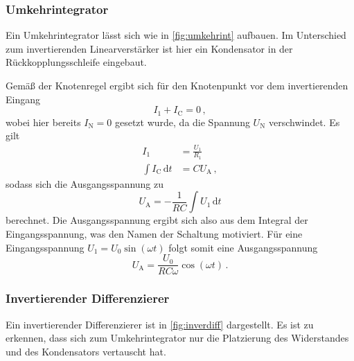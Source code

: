 \subsubsection{Umkehrintegrator}

\noindent
Ein Umkehrintegrator lässt sich wie in \autoref{fig:umkehrint} aufbauen. Im Unterschied zum invertierenden Linearverstärker ist hier ein Kondensator in der Rückkopplungsschleife eingebaut.


\noindent
Gemäß der Knotenregel ergibt sich für den Knotenpunkt vor dem invertierenden Eingang 
\begin{equation*}
    I_1 + I_\text{C} = 0\, ,
\end{equation*}
wobei hier bereits $I_\text{N} = 0$ gesetzt wurde, da die Spannung $U_\text{N}$ verschwindet. Es gilt 
\begin{align*}
    I_1 &= \frac{U_1}{R_1} \\ 
    \int I_\text{C} \, \text{d}t &= C U_\text{A}\, ,
\end{align*}
sodass sich die Ausgangsspannung zu 
\begin{equation*}
    U_\text{A} = - \frac{1}{RC} \int U_1 \, \text{d}t
\end{equation*}
berechnet. Die Ausgangsspannung ergibt sich also aus dem Integral der Eingangsspannung, was den Namen der Schaltung motiviert. Für eine Eingangsspannung $U_1 = U_0 \sin(\omega t)$ folgt somit eine Ausgangsspannung 
\begin{equation}
    U_\text{A} = \frac{U_0}{RC\omega} \cos(\omega t)\, .
    \label{eqn:int}
\end{equation}

\subsubsection{Invertierender Differenzierer}

\noindent
Ein invertierender Differenzierer ist in \autoref{fig:inverdiff} dargestellt. Es ist zu erkennen, dass sich zum Umkehrintegrator nur die Platzierung des Widerstandes und des Kondensators vertauscht hat.


